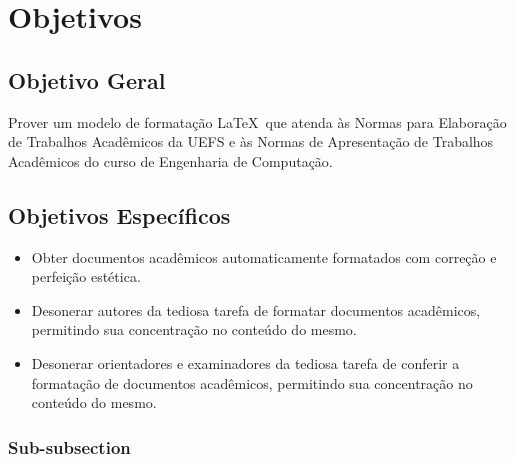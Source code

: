\section{Objetivos}

\subsection{Objetivo Geral}

Prover um modelo de formata\c{c}\~ao \LaTeX\ que atenda \`as Normas para Elabora\c{c}\~ao de Trabalhos Acad\^emicos da UEFS e \`as Normas de Apresenta\c{c}\~ao de Trabalhos Acad\^emicos do curso de Engenharia de Computa\c{c}\~ao.

\subsection{Objetivos Espec\'ificos}

\begin{itemize}
	\item Obter documentos acad\^emicos automaticamente formatados com corre\c{c}\~ao e perfei\c{c}\~ao est\'etica.
	\item Desonerar autores da tediosa tarefa de formatar documentos acad\^emicos, permitindo sua concentra\c{c}\~ao no conte\'udo do mesmo.
	\item Desonerar orientadores e examinadores da tediosa tarefa de conferir a formata\c{c}\~ao de documentos acad\^emicos, permitindo sua concentra\c{c}\~ao no conte\'udo do mesmo.
\end{itemize}

\subsubsection{Sub-subsection}
